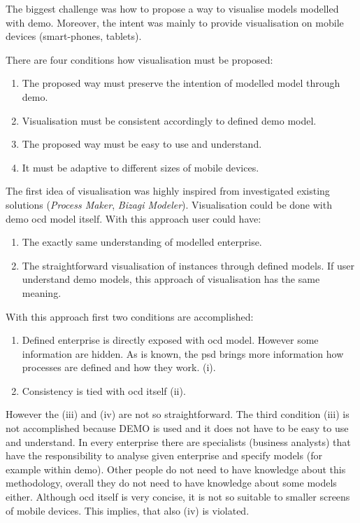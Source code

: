 The biggest challenge was how to propose a way to visualise models modelled with \gls{demo}. Moreover, the intent was mainly to provide visualisation on mobile devices (smart-phones, tablets).

There are four conditions how visualisation must be proposed:
\begin{enumerate}
	\item The proposed way must preserve the intention of modelled model through \gls{demo}.
    \item Visualisation must be consistent accordingly to defined \gls{demo} model.
    \item The proposed way must be easy to use and understand.  
    \item It must be adaptive to different sizes of mobile devices. 
\end{enumerate}

The first idea of visualisation was highly inspired from investigated existing solutions (\textit{Process Maker}, \textit{Bizagi Modeler}). Visualisation could be done with \gls{demo} \gls{ocd} model itself. With this approach user could have:
\begin{enumerate}
  \item The exactly same understanding of modelled enterprise.
  \item The straightforward visualisation of instances through defined models. If user understand \gls{demo} models, this approach of visualisation has the same meaning.
\end{enumerate}

With this approach first two conditions are accomplished:
\begin{enumerate}
\item Defined enterprise is directly exposed with \gls{ocd} model. However some information are hidden. As is known, the \gls{psd} brings more information how processes are defined and how they work. (i).
\item Consistency is tied with \gls{ocd} itself (ii).
\end{enumerate}

However the (iii) and (iv) are not so straightforward. The third condition (iii) is not accomplished because DEMO is used and it does not have to be easy to use and understand. In every enterprise there are specialists (business analysts) that have the responsibility to analyse given enterprise and specify models (for example within \gls{demo}). Other people do not need to have knowledge about this methodology, overall they do not need to have knowledge about some models either. Although \gls{ocd} itself is very concise, it is not so suitable to smaller screens of mobile devices. This implies, that also (iv) is violated.

